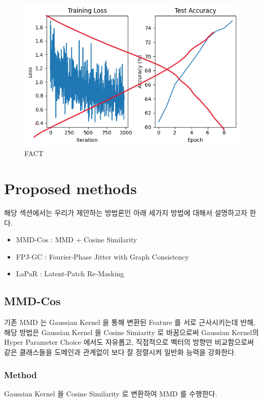 \begin{figure}[h]
  \centering
  \includegraphics[width=\linewidth]{images/temp.png}
  \caption{FACT}
  \label{fig:FACT1}
\end{figure}


\section{Proposed methods}
해당 섹션에서는 우리가 제안하는 방법론인 아래 세가지 방법에 대해서 설명하고자 한다.
\vspace{1em}
\begin{itemize}[leftmargin=2em]
  \item MMD-Cos : MMD + Cosine Similarity
  \item FPJ-GC : Fourier‑Phase Jitter with Graph Consistency
  \item LaPaR : Latent‑Patch Re‑Masking
\end{itemize}

\subsection{MMD-Cos}

기존 MMD 는 Gaussian Kernel 을 통해 변환된 Feature 를 서로 근사시키는데 반해, 
해당 방법은 Gaussian Kernel 을 Cosine Simiarity 로 바꿈으로써 Gaussian Kernel의 
Hyper Parameter Choice 에서도 자유롭고, 직접적으로 벡터의 방향만 비교함으로써 
같은 클래스들을 도메인과 관계없이 보다 잘 정렬시켜 일반화 능력을 강화한다.

\subsubsection{Method}
Gaussian Kernel 을 Cosine Similarity 로 변환하여 MMD 를 수행한다.

